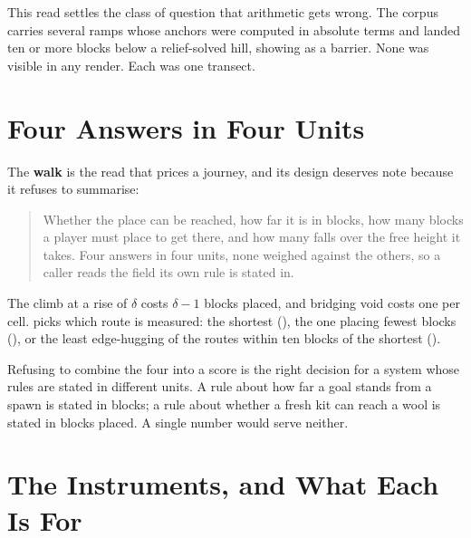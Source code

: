 This read settles the class of question that arithmetic gets wrong. The corpus
carries several ramps whose anchors were computed in absolute terms and landed ten
or more blocks below a relief-solved hill, showing as a barrier. None was visible in
any render. Each was one transect.

\section{Four Answers in Four Units}

The \textbf{walk} is the read that prices a journey, and its design deserves note
because it refuses to summarise:

\begin{quote}
Whether the place can be reached, how far it is in blocks, how many blocks a player
must place to get there, and how many falls over the free height it takes. Four
answers in four units, none weighed against the others, so a caller reads the field
its own rule is stated in.
\end{quote}

The climb at a rise of $\delta$ costs $\delta - 1$ blocks placed, and bridging void
costs one per cell.  picks which route is measured: the shortest
(), the one placing fewest blocks (), or the least
edge-hugging of the routes within ten blocks of the shortest ().

Refusing to combine the four into a score is the right decision for a system whose
rules are stated in different units. A rule about how far a goal stands from a spawn
is stated in blocks; a rule about whether a fresh kit can reach a wool is stated in
blocks placed. A single number would serve neither.

\section{The Instruments, and What Each Is For}

